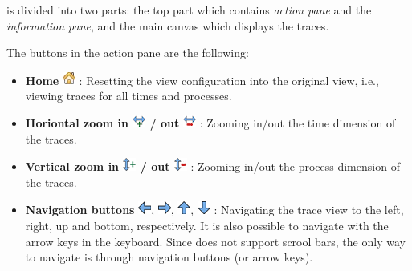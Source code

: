 \traceview{} is divided into two parts: the top part which contains \emph{action pane} and the \emph{information pane}, and the main canvas which displays the traces.

The buttons in the action pane are the following:
\begin{itemize}

\item \textbf{Home} \includegraphics[scale=.5]{fig/hpctraceviewer-button-home-screen.png} : Resetting the view configuration into the original view, i.e., viewing traces for all times and processes.
\item \textbf{Horiontal zoom in \includegraphics{fig/hpctraceviewer-button-zoom-in-time.png} / out }\includegraphics{fig/hpctraceviewer-button-zoom-out-time.png} : Zooming in/out the time dimension of the traces.
\item \textbf{Vertical zoom in \includegraphics[scale=.5]{fig/hpctraceviewer-button-zoom-in-process.png} / out \includegraphics[scale=.5]{fig/hpctraceviewer-button-zoom-out-process.png} }: Zooming in/out the process dimension of the traces.
\item \textbf{Navigation buttons} \includegraphics[scale=.5]{fig/hpctraceviewer-button-go-east.png}, \includegraphics[scale=.5]{fig/hpctraceviewer-button-go-west.png}, \includegraphics[scale=.5]{fig/hpctraceviewer-button-go-north.png}, \includegraphics[scale=.5]{fig/hpctraceviewer-button-go-south.png} : Navigating the trace view to the left, right, up and bottom, respectively. It is also possible to navigate with the arrow keys in the keyboard. Since \traceview{} does not support scrool bars, the only way to navigate is through navigation buttons (or arrow keys).

\end{itemize}
